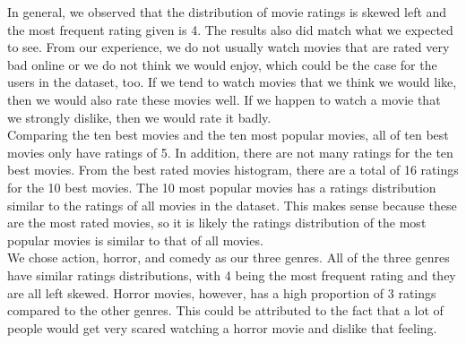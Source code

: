 \documentclass{article}
\begin{document}
In general, we observed that the distribution of movie ratings is skewed left and the most frequent rating given is 4. The results also did match what we expected to see. From our experience, we do not usually watch movies that are rated very bad online or we do not think we would enjoy, which could be the case for the users in the dataset, too. If we tend to watch movies that we think we would like, then we would also rate these movies well. If we happen to watch a movie that we strongly dislike, then we would rate it badly. \\
Comparing the ten best movies and the ten most popular movies, all of ten best movies only have ratings of 5. In addition, there are not many ratings for the ten best movies. From the best rated movies histogram, there are a total of 16 ratings for the 10 best movies. The 10 most popular movies has a ratings distribution similar to the ratings of all movies in the dataset. This makes sense because these are the most rated movies, so it is likely the ratings distribution of the most popular movies is similar to that of all movies. \\
We chose action, horror, and comedy as our three genres. All of the three genres have similar ratings distributions, with 4 being the most frequent rating and they are all left skewed. Horror movies, however, has a high proportion of 3 ratings compared to the other genres. This could be attributed to the fact that a lot of people would get very scared watching a horror movie and dislike that feeling. 

\newpage
\end{document}
